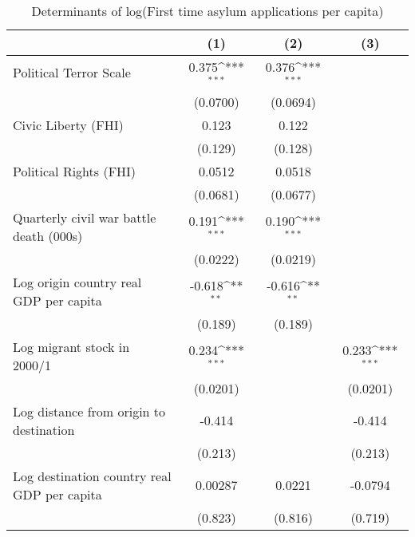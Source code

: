 \begin{table}[htbp]\centering
\def\sym#1{\ifmmode^{#1}\else\(^{#1}\)\fi}
\caption{Determinants of log(First time asylum applications per capita)}
\begin{tabular}{l*{3}{c}}
\hline\hline
                    &\multicolumn{1}{c}{(1)}         &\multicolumn{1}{c}{(2)}         &\multicolumn{1}{c}{(3)}         \\
\hline
Political Terror Scale&       0.375\sym{***}&       0.376\sym{***}&                     \\
                    &    (0.0700)         &    (0.0694)         &                     \\
[1em]
Civic Liberty (FHI) &       0.123         &       0.122         &                     \\
                    &     (0.129)         &     (0.128)         &                     \\
[1em]
Political Rights (FHI)&      0.0512         &      0.0518         &                     \\
                    &    (0.0681)         &    (0.0677)         &                     \\
[1em]
Quarterly civil war battle death (000s)&       0.191\sym{***}&       0.190\sym{***}&                     \\
                    &    (0.0222)         &    (0.0219)         &                     \\
[1em]
Log origin country real GDP per capita&      -0.618\sym{**} &      -0.616\sym{**} &                     \\
                    &     (0.189)         &     (0.189)         &                     \\
[1em]
Log migrant stock in 2000/1&       0.234\sym{***}&                     &       0.233\sym{***}\\
                    &    (0.0201)         &                     &    (0.0201)         \\
[1em]
Log distance from origin to destination&      -0.414         &                     &      -0.414         \\
                    &     (0.213)         &                     &     (0.213)         \\
[1em]
Log destination country real GDP per capita&     0.00287         &      0.0221         &     -0.0794         \\
                    &     (0.823)         &     (0.816)         &     (0.719)         \\

\end{tabular}
\end{table}
